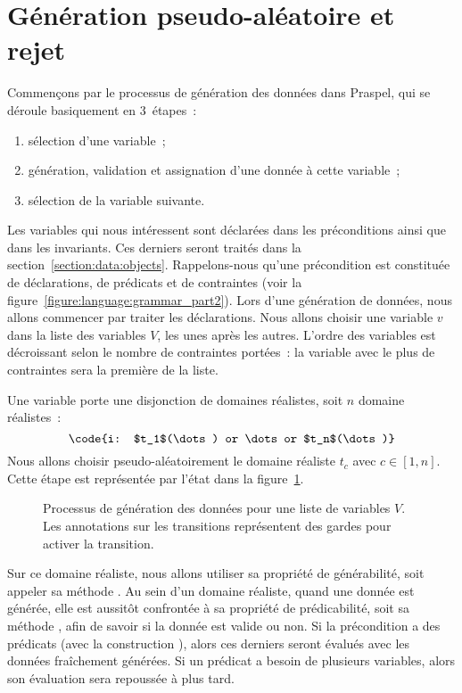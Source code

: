 \section{Génération pseudo-aléatoire et rejet}
\label{section:data:random}

Commençons par le processus de génération des données dans Praspel, qui se
déroule basiquement en 3~étapes~:

\begin{enumerate}

\item sélection d'une variable~;

\item génération, validation et assignation d'une donnée à cette variable~;

\item sélection de la variable suivante.

\end{enumerate}

Les variables qui nous intéressent sont déclarées dans les préconditions ainsi
que dans les invariants. Ces derniers seront traités dans la
section~\ref{section:data:objects}. Rappelons-nous qu'une précondition est
constituée de déclarations, de prédicats et de contraintes (voir la
figure~\ref{figure:language:grammar_part2}). Lors d'une génération de données,
nous allons commencer par traiter les déclarations. Nous allons choisir une
variable $v$ dans la liste des variables $V$, les unes après les autres.
L'ordre des variables est décroissant selon le nombre de contraintes portées~:
la variable avec le plus de contraintes sera la première de la liste.

Une variable porte une disjonction de domaines réalistes, soit $n$ domaine
réalistes~:
%
$$\code{i: $t_1$(\dots) or \dots or $t_n$(\dots)}$$
%
Nous allons choisir pseudo-aléatoirement le domaine réaliste $t_c$ avec $c \in
[1, n]$. Cette étape est représentée par l'état  dans la
figure~\ref{figure:data:process}.
%
\begin{figure}


\caption{\label{figure:data:process} Processus de génération des données pour
une liste de variables $V$. Les annotations sur les transitions représentent des
gardes pour activer la transition.}

\end{figure}
%
Sur ce domaine réaliste, nous allons utiliser sa propriété de générabilité, soit
appeler sa méthode . Au sein d'un domaine réaliste, quand une
donnée est générée, elle est aussitôt confrontée à sa propriété de
prédicabilité, soit sa méthode , afin de savoir si la donnée est
valide ou non. Si la précondition a des prédicats (avec la construction
), alors ces derniers seront évalués avec les données fraîchement
générées. Si un prédicat a besoin de plusieurs variables, alors son évaluation
sera repoussée à plus tard.

